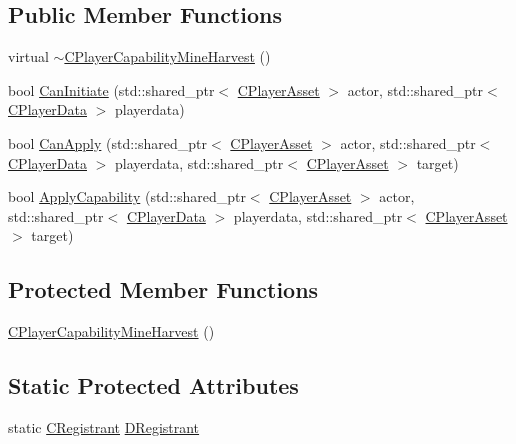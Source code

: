 \subsection*{Public Member Functions}
\begin{DoxyCompactItemize}
\item 
virtual \hyperlink{classCPlayerCapabilityMineHarvest_aae786f3ba01e3f26359a38166af77ce5}{$\sim$\+C\+Player\+Capability\+Mine\+Harvest} ()
\item 
bool \hyperlink{classCPlayerCapabilityMineHarvest_a37944eb249559f1246348b47e3f24dee}{Can\+Initiate} (std\+::shared\+\_\+ptr$<$ \hyperlink{classCPlayerAsset}{C\+Player\+Asset} $>$ actor, std\+::shared\+\_\+ptr$<$ \hyperlink{classCPlayerData}{C\+Player\+Data} $>$ playerdata)
\item 
bool \hyperlink{classCPlayerCapabilityMineHarvest_a31da799cc9bc9be9f986bd878d13283a}{Can\+Apply} (std\+::shared\+\_\+ptr$<$ \hyperlink{classCPlayerAsset}{C\+Player\+Asset} $>$ actor, std\+::shared\+\_\+ptr$<$ \hyperlink{classCPlayerData}{C\+Player\+Data} $>$ playerdata, std\+::shared\+\_\+ptr$<$ \hyperlink{classCPlayerAsset}{C\+Player\+Asset} $>$ target)
\item 
bool \hyperlink{classCPlayerCapabilityMineHarvest_a76a72fe97148f5026e67aab24ab21b21}{Apply\+Capability} (std\+::shared\+\_\+ptr$<$ \hyperlink{classCPlayerAsset}{C\+Player\+Asset} $>$ actor, std\+::shared\+\_\+ptr$<$ \hyperlink{classCPlayerData}{C\+Player\+Data} $>$ playerdata, std\+::shared\+\_\+ptr$<$ \hyperlink{classCPlayerAsset}{C\+Player\+Asset} $>$ target)
\end{DoxyCompactItemize}
\subsection*{Protected Member Functions}
\begin{DoxyCompactItemize}
\item 
\hyperlink{classCPlayerCapabilityMineHarvest_aa170d0c33386809d234b73a2b0cf516d}{C\+Player\+Capability\+Mine\+Harvest} ()
\end{DoxyCompactItemize}
\subsection*{Static Protected Attributes}
\begin{DoxyCompactItemize}
\item 
static \hyperlink{classCPlayerCapabilityMineHarvest_1_1CRegistrant}{C\+Registrant} \hyperlink{classCPlayerCapabilityMineHarvest_aa493df2fd0bbae27ce1b7c4e2250a28c}{D\+Registrant}
\end{DoxyCompactItemize}
